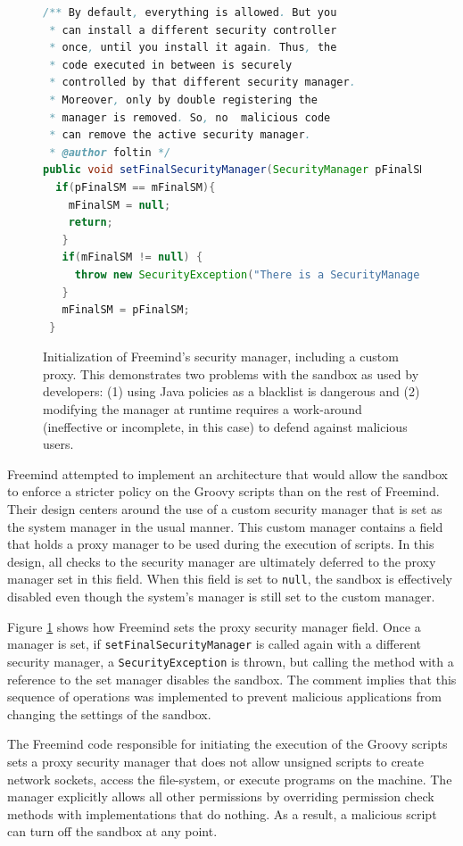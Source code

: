\documentclass{sig-alternate}
\begin{document}
\begin{figure}
\begin{lstlisting}[language=Java,firstnumber=31]
/** By default, everything is allowed. But you
 * can install a different security controller
 * once, until you install it again. Thus, the
 * code executed in between is securely
 * controlled by that different security manager.  
 * Moreover, only by double registering the
 * manager is removed. So, no  malicious code 
 * can remove the active security manager.  
 * @author foltin */
public void setFinalSecurityManager(SecurityManager pFinalSM) {
  if(pFinalSM == mFinalSM){
    mFinalSM = null;
    return;
   } 		
   if(mFinalSM != null) {
     throw new SecurityException("There is a SecurityManager installed already."); 		
   } 		
   mFinalSM = pFinalSM;
 }	
\end{lstlisting}
\caption{Initialization of Freemind's 
  \label{fig:Freemind-Security-Manager} security manager, including a custom proxy.
  This demonstrates two problems with the sandbox as used by developers: (1) 
  using Java policies as a blacklist is
  dangerous and (2) modifying the manager at runtime requires 
  a work-around (ineffective or incomplete, in this case) to defend against malicious
  users.}
\end{figure}

Freemind attempted to implement an architecture that would allow the
sandbox to enforce a stricter policy on the Groovy scripts than on
the rest of Freemind. Their design centers around the use of a custom
security manager that is set as the system manager in the usual manner.
This custom manager contains a field that holds a proxy manager to be used during the execution of
scripts. In this design, all checks to the security manager are ultimately
deferred to the proxy manager set in this field. When
this field is set to \texttt{null}, the sandbox is effectively disabled
even though the system's manager is still set to the custom manager.

Figure \ref{fig:Freemind-Security-Manager} shows how Freemind sets
the proxy security manager field.
Once a manager is set, if \texttt{setFinalSecurityManager} is called
again with a different security manager, a \texttt{SecurityException}
is thrown, but calling the method with a reference to the set manager disables
the sandbox. The comment implies that this sequence
of operations was implemented to prevent malicious applications from
changing the settings of the sandbox.

The Freemind code responsible for initiating the execution of the
Groovy scripts sets a proxy security manager that does not allow unsigned
scripts to create network sockets, access the file-system, or execute
programs on the machine. The manager explicitly allows all other permissions by overriding permission check methods with implementations that do nothing. As a result, a malicious script can turn off the sandbox at any point.
\end{document}
